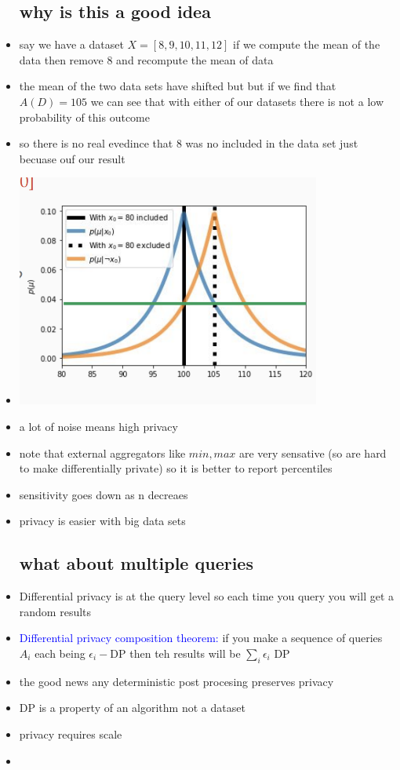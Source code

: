 \documentclass{article}
\begin{document}
\begin{itemize}
\subsection*{why is this a good idea }
\item say we have a dataset $X=[8,9,10,11,12]$ if we compute the mean of the data then remove 8 and recompute the mean of data 
\item the mean of the two data sets have shifted but but if we find that $A(D)=105$ we can see that with either of our datasets there is not a low probability of this outcome 
\item so there is no real evedince that 8 was no included in the data set just becuase ouf our result 
\item \includegraphics*[width=10cm]{images/Screenshot 2023-05-11 at 10.33.06 PM.png}
\item a lot of noise means high privacy
\item note that external aggregators like $min, max$ are very sensative (so are hard to make differentially private) so it is better to report percentiles 
\item sensitivity goes down as n decreaes 
\item privacy is easier with big data sets 
\subsection*{what about multiple queries}
\item Differential privacy is at the query level so each time you query you will get a random results
\item \textcolor{blue}{Differential privacy composition theorem:} if you make a sequence of queries $A_i$ each being $\epsilon_i-$DP then teh results will be $\sum_{i}\epsilon_i$ DP 
\item the good news any deterministic  post procesing preserves privacy
\item DP is a property of an algorithm not a dataset
\item privacy requires scale 
\item 

\end{itemize}
\end{document}
